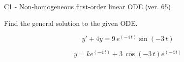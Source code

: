 \begin{exercise}
  \begin{exerciseTitle}C1 - Non-homogeneous first-order linear ODE (ver. 65)\end{exerciseTitle}
  \begin{exerciseStatement}
    
Find the general solution to the given ODE.

    
\[y'+4y= 9 \, e^{\left(-4 \, t\right)} \sin\left(-3 \, t\right)\]

  \end{exerciseStatement}
  \begin{exerciseAnswer}
    
\[y= k e^{\left(-4 \, t\right)} + 3 \, \cos\left(-3 \, t\right) e^{\left(-4 \, t\right)}\]

  \end{exerciseAnswer}
\end{exercise}